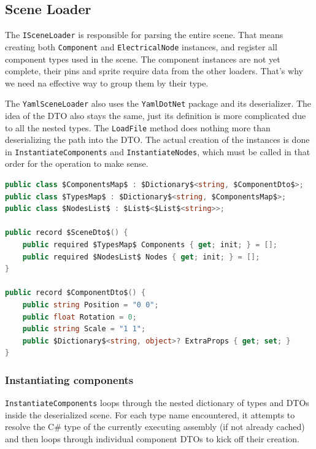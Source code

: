 \subsection{Scene Loader}

The \texttt{ISceneLoader} is responsible for parsing the entire scene. That means creating both \texttt{Component} and \texttt{ElectricalNode} instances, and register all component types used in the scene. The component instances are not yet complete, their pins and sprite require data from the other loaders. That's why we need na effective way to group them by their type.

The \texttt{YamlSceneLoader} also uses the \texttt{YamlDotNet} package and its deserializer. The idea of the DTO also stays the same, just its definition is more complicated due to all the nested types. The \texttt{LoadFile} method does nothing more than deserializing the path into the DTO. The actual creation of the instances is done in \texttt{InstantiateComponents} and \texttt{InstantiateNodes}, which must be called in that order for the operation to make sense.

\begin{lstlisting}[language=csharp, caption={\texttt{YamlSceneLoader.SceneDto} definitions}]
public class $ComponentsMap$ : $Dictionary$<string, $ComponentDto$>;
public class $TypesMap$ : $Dictionary$<string, $ComponentsMap$>;
public class $NodesList$ : $List$<$List$<string>>;

public record $SceneDto$() {
    public required $TypesMap$ Components { get; init; } = [];
    public required $NodesList$ Nodes { get; init; } = [];
}

public record $ComponentDto$() {
    public string Position = "0 0";
    public float Rotation = 0;
    public string Scale = "1 1";
    public $Dictionary$<string, object>? ExtraProps { get; set; } 
}
\end{lstlisting}

\subsubsection{Instantiating components}

\texttt{InstantiateComponents} loops through the nested dictionary of types and DTOs inside the deserialized scene. For each type name encountered, it attempts to resolve the C\# type of the currently executing assembly (if not already cached) and then loops through individual component DTOs to kick off their creation.

